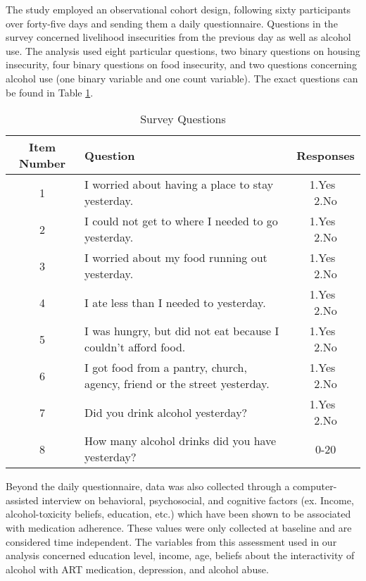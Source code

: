 \documentclass{svjour3}                     %
\begin{document}
The study employed an observational cohort design, following sixty participants over forty-five days and sending them a daily questionnaire. Questions in the survey concerned livelihood insecurities from the previous day as well as alcohol use. The analysis used eight particular questions, two binary questions on housing insecurity, four binary questions on food insecurity, and two questions concerning alcohol use  (one binary variable and one count variable). The exact questions can be found in Table \ref{tab:table1}. \par

\begin{table}[t]
	\centering
	\caption{Survey Questions}
	\label{tab:table1}
	\begin{tabular}{cp{6.5cm}c}
		\toprule
		Item Number & Question & Responses\\
		\midrule
		1 & I worried about having a place to stay yesterday. & 1.Yes $\>$ 2.No \\
		2 & I could not get to where I needed to go yesterday. & 1.Yes $\>$ 2.No \\
		3 & I worried about my food running out yesterday. & 1.Yes $\>$ 2.No \\
		4 & I ate less than I needed to yesterday. & 1.Yes $\>$ 2.No \\
		5 & I was hungry, but did not eat because I couldn't afford food. & 1.Yes $\>$ 2.No \\
		6 & I got food from a pantry, church, agency, friend or the street yesterday. & 1.Yes $\>$ 2.No \\
		7 & Did you drink alcohol yesterday? & 1.Yes $\>$ 2.No \\
		8 & How many alcohol drinks did you have yesterday? & 0-20 \\
		\bottomrule
	\end{tabular}
\end{table}

Beyond the daily questionnaire, data was also collected through a computer-assisted interview on behavioral, psychosocial, and cognitive factors (ex. Income, alcohol-toxicity beliefs, education, etc.) which have been shown to be associated with medication adherence. These values were only collected at baseline and are considered time independent. The variables from this assessment used in our analysis concerned education level, income, age, beliefs about the interactivity of alcohol with ART medication, depression, and alcohol abuse. \par
\end{document}
